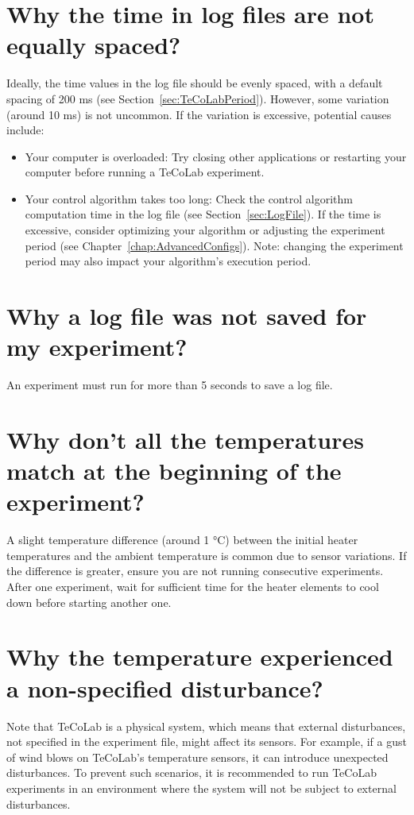 \documentclass[12pt]{report}
\begin{document}
\section{Why the time in log files are not equally spaced?}

Ideally, the time values in the log file should be evenly spaced, with a default spacing of 200 ms (see Section~\ref{sec:TeCoLabPeriod}). However, some variation (around 10 ms) is not uncommon. If the variation is excessive, potential causes include:
\begin{itemize}
\item Your computer is overloaded: Try closing other applications or restarting your computer before running a TeCoLab experiment.
\item Your control algorithm takes too long: Check the control algorithm computation time in the log file (see Section~\ref{sec:LogFile}). If the time is excessive, consider optimizing your algorithm or adjusting the experiment period (see Chapter~\ref{chap:AdvancedConfigs}). Note: changing the experiment period may also impact your algorithm's execution period.
\end{itemize}

\section{Why a log file was not saved for my experiment?}

An experiment must run for more than 5 seconds to save a log file.

\section{Why don't all the temperatures match at the beginning of the experiment?}

A slight temperature difference (around 1 °C) between the initial heater temperatures and the ambient temperature is common due to sensor variations. If the difference is greater, ensure you are not running consecutive experiments. After one experiment, wait for sufficient time for the heater elements to cool down before starting another one.

\section{Why the temperature experienced a non-specified disturbance?}

Note that TeCoLab is a physical system, which means that external disturbances, not specified in the experiment file, might affect its sensors. For example, if a gust of wind blows on TeCoLab's temperature sensors, it can introduce unexpected disturbances. To prevent such scenarios, it is recommended to run TeCoLab experiments in an environment where the system will not be subject to external disturbances.
\end{document}
